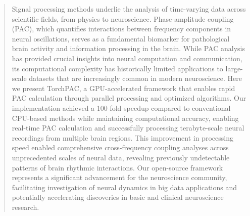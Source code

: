
\begin{abstract}
Signal processing methods underlie the analysis of time-varying data across scientific fields, from physics to neuroscience. Phase-amplitude coupling (PAC), which quantifies interactions between frequency components in neural oscillations, serves as a fundamental biomarker for pathological brain activity and information processing in the brain. While PAC analysis has provided crucial insights into neural computation and communication, its computational complexity has historically limited applications to large-scale datasets that are increasingly common in modern neuroscience. Here we present TorchPAC, a GPU-accelerated framework that enables rapid PAC calculation through parallel processing and optimized algorithms. Our implementation achieved a 100-fold speedup compared to conventional CPU-based methods while maintaining computational accuracy, enabling real-time PAC calculation and successfully processing terabyte-scale neural recordings from multiple brain regions. This improvement in processing speed enabled comprehensive cross-frequency coupling analyses across unprecedented scales of neural data, revealing previously undetectable patterns of brain rhythmic interactions. Our open-source framework represents a significant advancement for the neuroscience community, facilitating investigation of neural dynamics in big data applications and potentially accelerating discoveries in basic and clinical neuroscience research.

\end{abstract}

